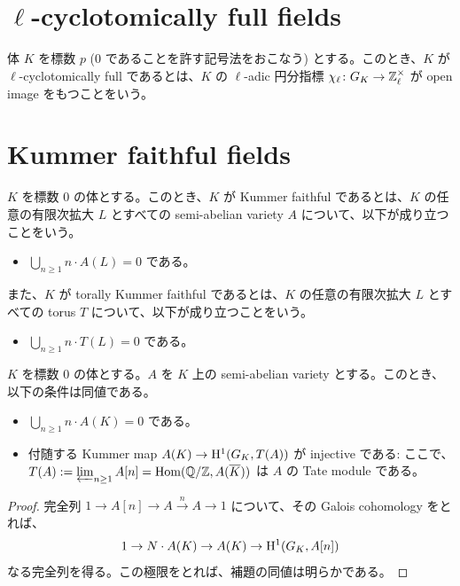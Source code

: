 \section{$\ell$-cyclotomically full fields}
\begin{defn}\label{000K}
  体 $K$ を標数 $p$ ($0$ であることを許す記号法をおこなう) とする。このとき、$K$ が $\ell$-cyclotomically full であるとは、$K$ の $\ell$-adic 円分指標 $\chi_\ell \colon G_K \to \mathbb{Z}_\ell^\times$ が open image をもつことをいう。
\end{defn}

\section{Kummer faithful fields}
\begin{defn}\label{000J}
  $K$ を標数 $0$ の体とする。このとき、$K$ が Kummer faithful であるとは、$K$ の任意の有限次拡大 $L$ とすべての semi-abelian variety $A$ について、以下が成り立つことをいう。
  \begin{itemize}
    \item $\bigcup_{n \geq 1}n \cdot A(L) = 0$ である。
  \end{itemize}
  また、$K$ が torally Kummer faithful であるとは、$K$ の任意の有限次拡大 $L$ とすべての torus $T$ について、以下が成り立つことをいう。
  \begin{itemize}
    \item $\bigcup_{n \geq 1}n \cdot T(L) = 0$ である。
  \end{itemize}
\end{defn}

\begin{lem}\label{000L}
  $K$ を標数 $0$ の体とする。$A$ を $K$ 上の semi-abelian variety とする。このとき、以下の条件は同値である。
  \begin{itemize}
    \item $\bigcup_{n \geq 1}n \cdot A(K) = 0$ である。
    \item 付随する Kummer map $A(K) \to \mathrm{H}^1(G_K, T(A))$ が injective である: ここで、$T(A) := \varprojlim_{n \geq 1}A[n] = \mathrm{Hom}(\mathbb{Q}/\mathbb{Z}, A(\overline{K}))$ は $A$ の Tate module である。
  \end{itemize}
\end{lem}
\begin{proof}
  完全列 $1 \to A[n] \to A \xrightarrow{n} A \to 1$ について、その Galois cohomology をとれば、\[1 \to N \cdot A(K) \to A(K) \to \mathrm{H}^1(G_K, A[n])\] なる完全列を得る。この極限をとれば、補題の同値は明らかである。
\end{proof}

